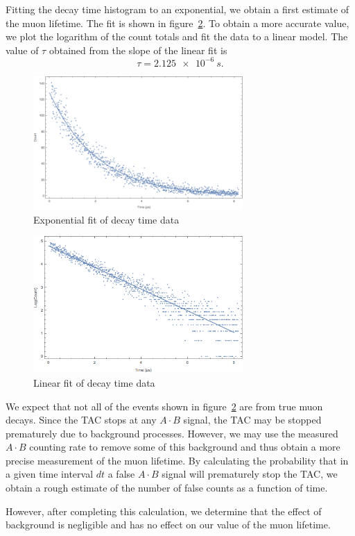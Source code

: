 \documentclass[aps, reprint,amsmath,amssymb]{revtex4-1} %
\begin{document}
Fitting the decay time histogram to an exponential, we obtain a first estimate of the muon lifetime. The fit is shown in figure~\ref{fig:fit}. To obtain a more accurate value, we plot the logarithm of the count totals and fit the data to a linear model. The value of $\tau$ obtained from the slope of the linear fit is
\[
	\tau = \SI{2.125e-6}{s}.
\]
\begin{figure}[t!]
\centering
\includegraphics[width=8cm]{fit.png}
\caption{Exponential fit of decay time data}
\label{fig:fit}
\end{figure}

\begin{figure}[t]
\centering
\includegraphics[width=8cm]{linearfit.png}
\caption{Linear fit of decay time data}
\label{fig:fit}
\end{figure}

We expect that not all of the events shown in figure~\ref{fig:fit} are from true muon decays. Since the TAC stops at any $A \cdot B$ signal, the TAC may be stopped prematurely due to background processes. However, we may use the measured $A \cdot B$ counting rate to remove some of this background and thus obtain a more precise measurement of the muon lifetime. By calculating the probability that in a given time interval $dt$ a false $A \cdot B$ signal will prematurely stop the TAC, we obtain a rough estimate of the number of false counts as a function of time. 

However, after completing this calculation, we determine that the effect of background is negligible and has no effect on our value of the muon lifetime. 
\end{document}
